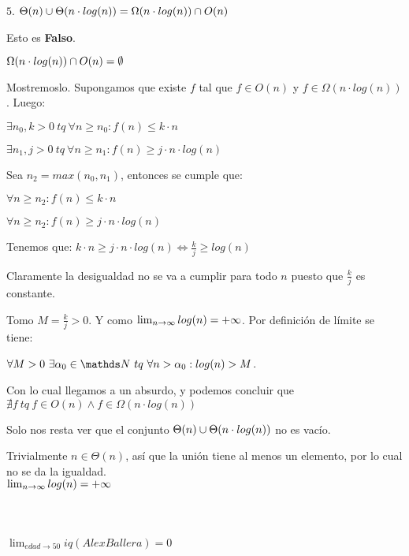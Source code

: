\documentclass[10pt,a4paper]{article}
\begin{document}
\demoline
\demoline
\par $5.$ \ensuremath{\Theta(n) \union \Theta(n \cdot log(n))= \Omega(n \cdot log(n)) \interseccion O(n)} 
\demoline
\begin{groupIzq}{2.5em}
  \par Esto es \textbf{Falso}.
  \par \ensuremath{\Omega(n \cdot log(n)) \interseccion O(n) = \emptyset}
  \par Mostremoslo. Supongamos que existe \ensuremath{f} tal que \ensuremath{f \in O(n)} y \ensuremath{f \in \Omega(n \cdot log(n))}. Luego:
  \begin{groupIzq}{1em}
    \par \ensuremath{\exists n_0, k > 0\ tq\ \forall n \geq n_0 : f(n) \leq k \cdot n}
    \par \ensuremath{\exists n_1, j > 0\ tq\ \forall n \geq n_1 : f(n) \geq j \cdot n \cdot log(n)}
    \par Sea \ensuremath{n_2=max(n_0, n_1)}, entonces se cumple que:
    \par \ensuremath{\forall n \geq n_2 : f(n) \leq k \cdot n}
    \par \ensuremath{\forall n \geq n_2 : f(n) \geq j \cdot n \cdot log(n)}
    \par Tenemos que: \ensuremath{k \cdot n \geq j \cdot n \cdot log(n) \Leftrightarrow \frac{k}{j} \geq log(n)}
    \par Claramente la desigualdad no se va a cumplir para todo \ensuremath{n} puesto que \ensuremath{\frac{k}{j}} es constante.
    \par Tomo \ensuremath{M = \frac{k}{j} > 0}. Y como \ensuremath{\limn log(n) = +\infty}. Por definición de límite se tiene:
    \par \ensuremath{\forall M > 0 \ \exists \alpha_0 \in \nat \ tq\ \forall n > \alpha_0 : log(n) > M}.
  \end{groupIzq}
  \par Con lo cual llegamos a un absurdo, y podemos concluir que \ensuremath{\nexists f\ tq\ f \in O(n) \land f \in \Omega(n \cdot log(n))} 
  \par Solo nos resta ver que el conjunto \ensuremath{\Theta(n) \union \Theta(n \cdot log(n))} no es vacío.
  \par Trivialmente \ensuremath{n \in \Theta(n)}, así que la unión tiene al menos un elemento, por lo cual no se da la igualdad.
  \\
  \ensuremath{\limn log(n) = +\infty}
  \\\\\\\\
  \ensuremath{\lim_{edad \to 50} iq(AlexBallera) = 0}
\end{groupIzq}





\end{document}
